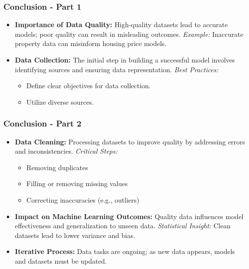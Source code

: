 \documentclass[aspectratio=169]{beamer}
\begin{document}
\begin{frame}[fragile]
    \frametitle{Conclusion - Part 1}
    \begin{itemize}
        \item \textbf{Importance of Data Quality:}  
        High-quality datasets lead to accurate models; poor quality can result in misleading outcomes.  
        \textit{Example:} Inaccurate property data can misinform housing price models.

        \item \textbf{Data Collection:}  
        The initial step in building a successful model involves identifying sources and ensuring data representation.  
        \textit{Best Practices:}
        \begin{itemize}
            \item Define clear objectives for data collection.
            \item Utilize diverse sources.
        \end{itemize}
    \end{itemize}
\end{frame}

\begin{frame}[fragile]
    \frametitle{Conclusion - Part 2}
    \begin{itemize}
        \item \textbf{Data Cleaning:}  
        Processing datasets to improve quality by addressing errors and inconsistencies.  
        \textit{Critical Steps:}
        \begin{itemize}
            \item Removing duplicates
            \item Filling or removing missing values
            \item Correcting inaccuracies (e.g., outliers)
        \end{itemize}

        \item \textbf{Impact on Machine Learning Outcomes:}  
        Quality data influences model effectiveness and generalization to unseen data.  
        \textit{Statistical Insight:} Clean datasets lead to lower variance and bias.

        \item \textbf{Iterative Process:}  
        Data tasks are ongoing; as new data appears, models and datasets must be updated.
    \end{itemize}
\end{frame}
\end{document}
